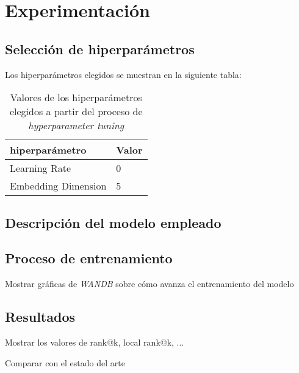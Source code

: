 \chapter{Experimentación}

\section{Selección de hiperparámetros}

Los hiperparámetros elegidos se muestran en la siguiente tabla:

\begin{table}[H]
\centering
\begin{tabular}{|l|l|}
    \hline
    \textbf{hiperparámetro} & \textbf{Valor} \\
    \hline

    Learning Rate & 0 \\
    Embedding Dimension & 5 \\

    \hline

\end{tabular}
\caption{Valores de los hiperparámetros elegidos a partir del proceso de \textit{hyperparameter tuning}}
\end{table}

\section{Descripción del modelo empleado}

\section{Proceso de entrenamiento}

Mostrar gráficas de \textit{WANDB} sobre cómo avanza el entrenamiento del modelo

\section{Resultados}

Mostrar los valores de rank@k, local rank@k, ...

Comparar con el estado del arte
